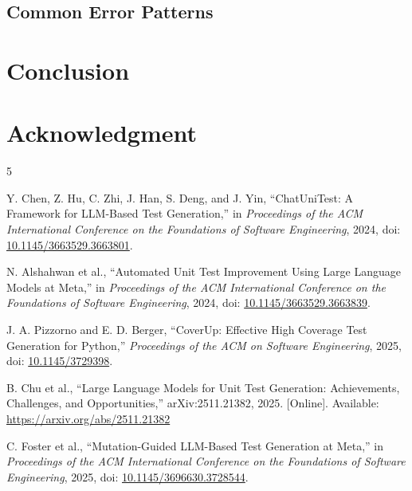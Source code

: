 \documentclass[journal]{IEEEtran}
\begin{document}
\subsection{Common Error Patterns}

\section{Conclusion}

\section*{Acknowledgment}


\begin{thebibliography}{5}

Y. Chen, Z. Hu, C. Zhi, J. Han, S. Deng, and J. Yin,
``ChatUniTest: A Framework for LLM-Based Test Generation,''
in \emph{Proceedings of the ACM International Conference on the Foundations of Software Engineering},
2024, doi: \href{https://doi.org/10.1145/3663529.3663801}{10.1145/3663529.3663801}.

N. Alshahwan et al.,
``Automated Unit Test Improvement Using Large Language Models at Meta,''
in \emph{Proceedings of the ACM International Conference on the Foundations of Software Engineering},
2024, doi: \href{https://doi.org/10.1145/3663529.3663839}{10.1145/3663529.3663839}.

J. A. Pizzorno and E. D. Berger,
``CoverUp: Effective High Coverage Test Generation for Python,''
\emph{Proceedings of the ACM on Software Engineering},
2025, doi: \href{https://doi.org/10.1145/3729398}{10.1145/3729398}.

B. Chu et al.,
``Large Language Models for Unit Test Generation: Achievements, Challenges, and Opportunities,''
arXiv:2511.21382, 2025. [Online]. Available:
\url{https://arxiv.org/abs/2511.21382}

C. Foster et al.,
``Mutation-Guided LLM-Based Test Generation at Meta,''
in \emph{Proceedings of the ACM International Conference on the Foundations of Software Engineering},
2025, doi: \href{https://doi.org/10.1145/3696630.3728544}{10.1145/3696630.3728544}.

\end{thebibliography}
\end{document}
